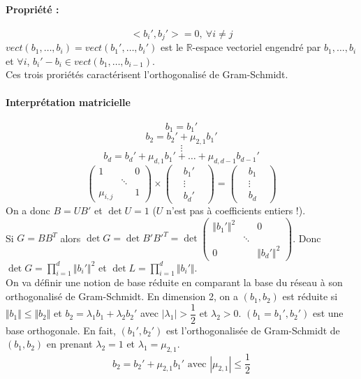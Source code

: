 \documentclass[12pt,a4paper]{report}
\begin{document}
\paragraph{Propriété :\\}
$$ <b_i',b_j'> =0,\ \forall i \neq j $$
$vect(b_1,\ldots,b_i) = vect(b_1',\ldots,b_i')$ est le $\mathbb{R}$-espace vectoriel engendré par $b_1,\ldots,b_i$ et $\forall i$, $b_i' - b_i \in vect(b_1,\ldots,b_{i-1})$.\\
Ces trois proriétés caractérisent l'orthogonalisé de Gram-Schmidt.
\paragraph{Interprétation matricielle\\}
$$ b_1=b_1'$$
$$ b_2 = b_2' + \mu_{2,1} b_1' $$
$$ \vdots $$
$$ b_d = b_d'+\mu_{d,1} b_1'+\ldots + \mu_{d,d-1} b_{d-1}' $$
$$ \left(\begin{array}{ccc}
1 & & 0 \\
 & \ddots & \\
\mu_{i,j} & & 1 \end{array}\right) \times \left(\begin{array}{ccc}
 & b_1' & \\
 & \vdots & \\
 & b_d' & \end{array}\right) = \left(\begin{array}{ccc}
 & b_1 & \\
 & \vdots & \\
 & b_d & \end{array}\right) $$
 On a donc $B=UB'$ et $\det U = 1$ ($U$ n'est pas à coefficients entiers !).\\
 Si $G=BB^T$ alors $\det G = \det B'B'^T = \det \left(\begin{array}{ccc}
\Vert b_1' \Vert ^2 & & 0 \\
 & \ddots & \\
 0 & & \Vert b_d' \Vert ^2 \end{array}\right)$. Donc $\det G = \displaystyle \prod_{i=1}^d \Vert b_i' \Vert ^2 $ et $\det L =\displaystyle \prod_{i=1}^d \Vert b_i' \Vert $.\\
 
On va définir une notion de base réduite en comparant la base du réseau à son orthogonalisé de Gram-Schmidt. En dimension 2, on a $(b_1,b_2)$ est réduite si $\Vert b_1 \Vert \leqslant \Vert b_2 \Vert$ et $b_2 = \lambda_1 b_1 + \lambda_2 b_2'$ avec $|\lambda_1|> \dfrac{1}{2}$ et $\lambda_2 > 0$.
$(b_1 = b_1',b_2')$ est une base orthogonale. En fait, $(b_1',b_2')$ est l'orthogonalisée de Gram-Schmidt de $(b_1,b_2)$ en prenant $\lambda_2 = 1$ et $\lambda_1 = \mu_{2,1} $.
$$ b_2 = b_2' + \mu_{2,1}b_1' \mbox{ avec } |\mu_{2,1}| \leqslant \dfrac{1}{2} $$
\end{document}
